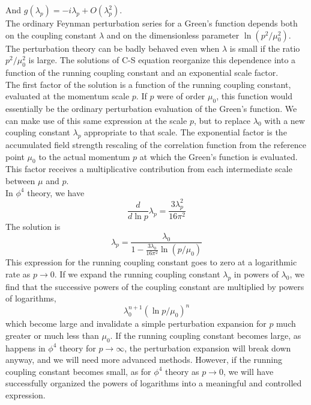 And $g(\lambda_p) = -i\lambda_p + O(\lambda_p^2)$.
\\
The ordinary Feynman perturbation series for a Green's function depends both on the coupling constant $\lambda$ and on the dimensionless parameter $\ln(p^2/\mu_0^2)$. The perturbation theory can be badly behaved even when $\lambda$ is small if the ratio $p^2/\mu_0^2$ is large. The solutions of C-S equation reorganize this dependence into a function of the running coupling constant and an exponential scale factor. 
\\
The first factor of the solution is a function of the running coupling constant, evaluated at the momentum scale $p$. If $p$ were of order $\mu_0$, this function would essentially be the ordinary perturbation evaluation of the Green's function. We can make use of this same expression at the scale $p$, but to replace $\lambda_0$ with a new coupling constant $\lambda_p$ appropriate to that scale.
The exponential factor is the accumulated field strength rescaling of the correlation function from the reference point $\mu_0$ to the actual momentum $p$ at which the Green's function is evaluated. This factor receives a multiplicative contribution from each intermediate scale between $\mu$ and $p$.
\\
In $\phi^4$ theory, we have
\[\frac{d}{d\ln p} \lambda_p = \frac{3\lambda_p^2}{16\pi^2}\]
The solution is
\[\lambda_p = \frac{\lambda_0}{1 - \frac{3\lambda_0}{16\pi^2} \ln (p/\mu_0)}\]
This expression for the running coupling constant goes to zero at a logarithmic rate as $p \to 0$. If we expand the running coupling constant $\lambda_p$ in powers of $\lambda_0$, we find that the successive powers of the coupling constant are multiplied by powers of logarithms, 
\[\lambda_0^{n+1}(\ln p/\mu_0)^n\]
which become large and invalidate a simple perturbation expansion for $p$ much greater or much less than $\mu_0$. If the running coupling constant becomes large, as happens in $\phi^4$ theory for $p \to \infty$, the perturbation expansion will break down anyway, and we will need more advanced methods. However, if the running coupling constant becomes small, as for $\phi^4$ theory as $p \to 0$, we will have successfully organized the powers of logarithms into a meaningful and controlled expression.

